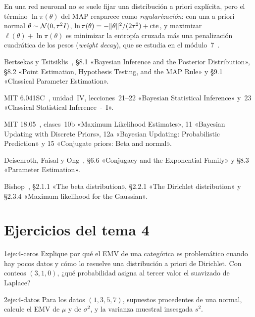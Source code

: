 \begin{observacion}
En una red neuronal no se suele fijar una distribución a priori explícita, pero el término $\ln\pi(\theta)$ del MAP reaparece como \emph{regularización}: con una a priori normal $\theta\sim\mathcal{N}(0,\tau^{2}I)$, $\ln\pi(\theta)=-\lVert\theta\rVert^{2}/(2\tau^{2})+\text{cte}$, y maximizar $\ell(\theta)+\ln\pi(\theta)$ es minimizar la entropía cruzada más una penalización cuadrática de los pesos (\emph{weight decay}), que se estudia en el módulo~7~\cite[§8.3]{mml}.
\end{observacion}

\begin{lecturas}
\item Bertsekas y Tsitsiklis~\cite{bt}, §8.1 «Bayesian Inference and the Posterior Distribution», §8.2 «Point Estimation, Hypothesis Testing, and the MAP Rule» y §9.1 «Classical Parameter Estimation».
\item MIT 6.041SC~\cite{mit6041}, unidad~IV, lecciones~21–22 «Bayesian Statistical Inference» y~23 «Classical Statistical Inference~-~I».
\item MIT 18.05~\cite{mit1805}, clases~10b «Maximum Likelihood Estimates», 11 «Bayesian Updating with Discrete Priors», 12a «Bayesian Updating: Probabilistic Prediction» y 15 «Conjugate priors: Beta and normal».
\item Deisenroth, Faisal y Ong~\cite{mml}, §6.6 «Conjugacy and the Exponential Family» y §8.3 «Parameter Estimation».
\item Bishop~\cite{bishop}, §2.1.1 «The beta distribution», §2.2.1 «The Dirichlet distribution» y §2.3.4 «Maximum likelihood for the Gaussian».
\end{lecturas}

\section*{Ejercicios del tema 4}

\begin{ejercicio}{1}{eje:4-ceros}
Explique por qué el EMV de una categórica es problemático cuando hay pocos datos y cómo lo resuelve una distribución a priori de Dirichlet. Con conteos $(3,1,0)$, ¿qué probabilidad asigna al tercer valor el suavizado de Laplace?
\end{ejercicio}

\begin{ejercicio}{2}{eje:4-datos}
Para los datos $(1,3,5,7)$, supuestos procedentes de una normal, calcule el EMV de $\mu$ y de $\sigma^{2}$, y la varianza muestral insesgada $s^{2}$.
\end{ejercicio}

